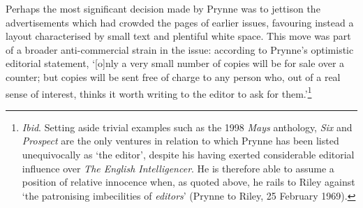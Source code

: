 \documentclass[]{article}
\begin{document}
Perhaps the most significant decision made by Prynne was to jettison the
advertisements which had crowded the pages of earlier issues, favouring
instead a layout characterised by small text and plentiful white space.
This move was part of a broader anti-commercial strain in the issue:
according to Prynne’s optimistic editorial statement, ‘{[}o{]}nly a very
small number of copies will be for sale over a counter; but copies will
be sent free of charge to any person who, out of a real sense of
interest, thinks it worth writing to the editor to ask for
them.’\footnote{\emph{Ibid}. Setting aside trivial examples such as the
  1998 \emph{Mays} anthology, \emph{Six} and \emph{Prospect} are the
  only ventures in relation to which Prynne has been listed
  unequivocally as ‘the editor’, despite his having exerted considerable
  editorial influence over \emph{The English Intelligencer}. He is
  therefore able to assume a position of relative innocence when, as
  quoted above, he rails to Riley against ‘the patronising imbecilities
  of \emph{editors}’ (Prynne to Riley, 25 February 1969).}
\end{document}
